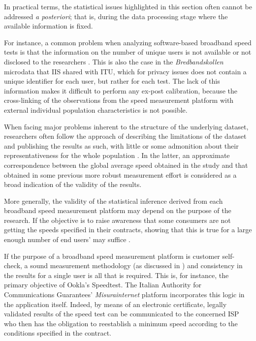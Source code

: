 \documentclass[12pt]{article}
\begin{document}
In practical terms, the statistical issues highlighted in this section often cannot be addressed \textit{a posteriori}; that is, during the data processing stage where the available information is fixed. 

For instance, a common problem when analyzing software-based broadband speed tests is that the information on the number of unique users is not available or not disclosed to the researchers \citep{canadi2012}. This is also the case in the \textit{Bredbandskollen} microdata that IIS shared with ITU, which for privacy issues does not contain a unique identifier for each user, but rather for each test. The lack of this information makes it difficult to perform any ex-post calibration, because the cross-linking of the observations from the speed measurement platform with external individual population characteristics is not possible.

When facing major problems inherent to the structure of the underlying dataset, researchers often follow the approach of describing the limitations of the dataset and publishing the results as such, with little \citep{prasad2016,wattegama2011,chetty2013} or some admonition about their representativeness for the whole population \citep{canadi2012,riddlesden2014}. In the latter, an approximate correspondence between the global average speed obtained in the study and that obtained in some previous more robust measurement effort is considered as a broad indication of the validity of the results.   
   
More generally, the validity of the statistical inference derived from each broadband speed measurement platform may depend on the purpose of the research. If the objective is to raise awareness that some consumers are not getting the speeds specified in their contracts, showing that this is true for a large enough number of end users' may suffice \citep{chetty2013,wattegama2011}. 

If the purpose of a broadband speed measurement platform is customer self-check, a sound measurement methodology (as discussed in ) and consistency in the results for a single user is all that is required. This is, for instance, the primary objective of Ookla's Speedtest. The Italian Authority for Communications Guarantees' \textit{Misurainternet} platform incorporates this logic in the application itself. Indeed, by means of an electronic certificate, legally validated results of the speed test can be communicated to the concerned ISP who then has the obligation to reestablish a minimum speed according to the conditions specified in the contract.
\end{document}
